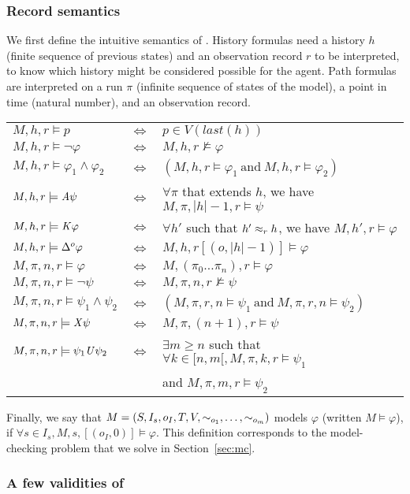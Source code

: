 \subsubsection{Record semantics}
We first define the intuitive semantics of \ctlskd. History formulas need a history $h$ (finite sequence of previous states) and an observation record $r$ to be interpreted, to know which history might be considered possible for the agent.
Path formulas are interpreted on a run $\pi$ (infinite sequence of states of the model), a point in time (natural number), and an observation record.

\begin{tabular}{l c l}
  $M,h,r \models p $&$ \iff $&$ p\in V(\mathit{last}(h))$\\
  $M,h,r \models \neg\varphi $&$ \iff $&$ M,h,r\not\models\varphi$\\
  $M,h,r \models \varphi_1\wedge\varphi_2 $&$ \iff $&$ (M,h,r\models\varphi_1~\text{and}~ M,h,r\models\varphi_2)$\\
  $M,h,r \models \mathit{A}\psi  $&$ \iff $&$ \forall\pi$ that extends $h$, we have $M,\pi,|h|-1,r\models\psi$\\
  $M,h,r \models\mathit{K}\varphi  $&$ \iff $&$ \forall h'$ such that $h'\approx_{r}h$, we have $M,h',r\models\varphi$\\
  $M,h,r \models \Delta^{o}\varphi $&$ \iff $&$ M,h,r[(o,|h|-1)]\models\varphi$\\
  $M,\pi,n,r\models\varphi $&$ \iff $&$ M,(\pi_0\dots\pi_n),r\models\varphi$\\
  $M,\pi,n,r\models\neg\psi $&$ \iff $&$ M,\pi,n,r\not\models\psi$\\
  $M,\pi,n,r\models \psi_1\wedge\psi_2 $&$ \iff $&$ (M,\pi,r,n\models\psi_1~\text{and}~ M,\pi,r,n\models\psi_2)$\\
  $M,\pi,n,r\models\mathit{X}\psi $&$ \iff $&$  M,\pi,(n+1),r\models\psi$\\
  $M,\pi,n,r\models \psi_1\mathit{U}\psi_2 $&$ \iff $&$ \exists m\geq n$ such that $\forall k\in[n,m[, M,\pi,k,r\models\psi_1$\\
   & & and $M,\pi,m,r\models\psi_2$
\end{tabular}

Finally, we say that $M=(S,I_s,o_I,T,V,\sim_{o_1},\dots,\sim_{o_m})$ models $\varphi$ (written $M\models\varphi$), if $\forall s\in I_s, M,s,[(o_I,0)]\models\varphi$. This definition corresponds to the model-checking problem that we solve in Section~\ref{sec:mc}.

\subsubsection{A few validities of \ctlskd}~

